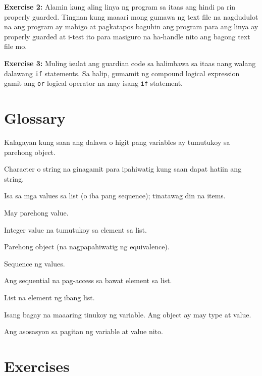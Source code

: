 \documentclass[10pt,]{book}
\providecommand{\tightlist}{%
  \setlength{\itemsep}{0pt}\setlength{\parskip}{0pt}}
\begin{document}
\textbf{Exercise 2:} Alamin kung aling linya ng program sa itaas ang
hindi pa rin properly guarded. Tingnan kung maaari mong gumawa ng text
file na nagdudulot na ang program ay mabigo at pagkatapos baguhin ang
program para ang linya ay properly guarded at i-test ito para masiguro
na ha-handle nito ang bagong text file mo.

\textbf{Exercise 3:} Muling isulat ang guardian code sa halimbawa sa
itaas nang walang dalawang \texttt{if} statements. Sa halip, gumamit ng
compound logical expression gamit ang \texttt{or} logical operator na
may isang \texttt{if} statement.

\section{Glossary}\label{glossary-7}

\begin{description}
\tightlist
\item[aliasing]
Kalagayan kung saan ang dalawa o higit pang variables ay tumutukoy sa
parehong object. 
\item[delimiter]
Character o string na ginagamit para ipahiwatig kung saan dapat hatiin
ang string. 
\item[element]
Isa sa mga values sa list (o iba pang sequence); tinatawag din na items.
\item[equivalent]
May parehong value. 
\item[index]
Integer value na tumutukoy sa element sa list.  \index{}
\item[identical]
Parehong object (na nagpapahiwatig ng equivalence). 
\item[list]
Sequence ng values. 
\item[list traversal]
Ang sequential na pag-access sa bawat element sa list.
\item[nested list]
List na element ng ibang list. 
\item[object]
Isang bagay na maaaring tinukoy ng variable. Ang object ay may type at
value. 
\item[reference]
Ang asosasyon sa pagitan ng variable at value nito. 
\end{description}

\section{Exercises}\label{exercises-7}
\end{document}
